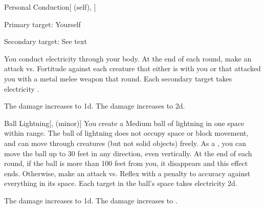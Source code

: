 \lowercase{\hypertarget{spell:Personal Conduction}{}}\label{spell:Personal Conduction}
\begin{attuneability}[Rank 3]{\hypertarget{spell:Personal Conduction}{Personal Conduction}}[ (self), ]

Primary target: Yourself
\par\noindent
Secondary target: See text

You conduct electricity through your body.
At the end of each round, make an attack vs. Fortitude against each creature that either is  with you or that attacked you with a metal melee weapon that round.
\hit Each secondary target takes electricity .

\rankline
{} The damage increases to  \plus1d.
 The damage increases to  \plus2d.

\end{attuneability}
\vspace{0.25em}



\lowercase{\hypertarget{spell:Ball Lightning}{}}\label{spell:Ball Lightning}
\begin{freeability}[Rank 4]{\hypertarget{spell:Ball Lightning}{Ball Lightning}}[,  (minor)]
You create a Medium ball of lightning in one space within \rngmed range.
The ball of lightning does not occupy space or block movement, and can move through creatures (but not solid objects) freely.
As a , you can move the ball up to 30 feet in any direction, even vertically.
At the end of each round, if the ball is more than 100 feet from you, it disappears and this effect ends.
Otherwise, make an attack vs. Reflex with a  penalty to accuracy against everything in its space.
\hit Each target in the ball's space takes electricity  \minus2d.

\rankline
{} The damage increases to  \minus1d.
 The damage increases to .

\end{freeability}
\vspace{0.25em}



